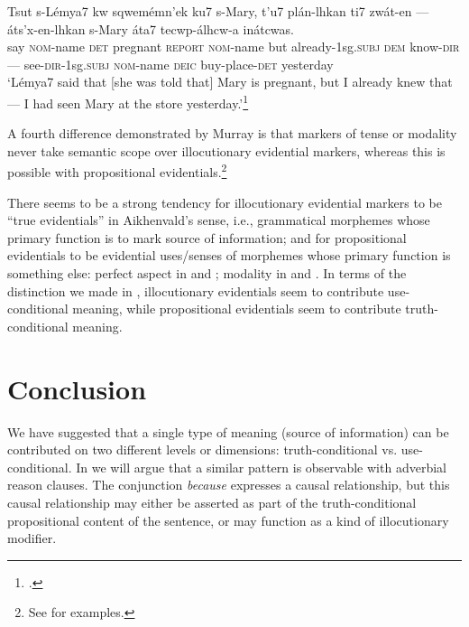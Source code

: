 \newpage

\ea  \label{ex:17.14}
\gll Tsut  s-Lémya7  kw  sqwemémn’ek  ku7  s-Mary,  t’u7  plán-lhkan ti7  zwát-en  ---  áts’x-en-lhkan  s-Mary  áta7  tecwp-álhcw-a  inátcwas.\\
say  \textsc{nom}-name  \textsc{det}  pregnant  \textsc{report}  \textsc{nom}-name  but  already-1sg.\textsc{subj} \textsc{dem}  know-\textsc{dir}  ---  see-\textsc{dir}-1sg.\textsc{subj}  \textsc{nom}-name  \textsc{deic}  buy-place-\textsc{det}  yesterday\\
\glt ‘Lémya7 said that [she was told that] Mary is pregnant, but I already knew that — I had seen Mary at the store yesterday.’\footnote{\citet{MatthewsonEtAl2007}.}
\z

A fourth difference demonstrated by Murray is that markers of tense or modality never take semantic scope over illocutionary evidential markers, whereas this is possible with propositional evidentials.\footnote{See \citet[§3.4.2]{Murray2010} for examples.}



There seems to be a strong tendency for illocutionary evidential markers to be “true evidentials” in Aikhenvald’s sense, i.e., grammatical morphemes whose primary function is to mark source of information; and for propositional evidentials to be evidential uses/senses of morphemes whose primary function is something else: perfect aspect in  and ; modality in  and . In terms of the distinction we made in , illocutionary evidentials seem to contribute use-conditional meaning, while propositional evidentials seem to contribute truth-conditional meaning.


\section{Conclusion}\label{sec:17.6}

We have suggested that a single type of meaning (source of information) can be contributed on two different levels or dimensions: truth-conditional vs. use-conditional. In  we will argue that a similar pattern is observable with adverbial reason clauses. The conjunction \textit{because} expresses a causal relationship, but this causal relationship may either be asserted as part of the truth-conditional propositional content of the sentence, or may function as a kind of illocutionary modifier.



